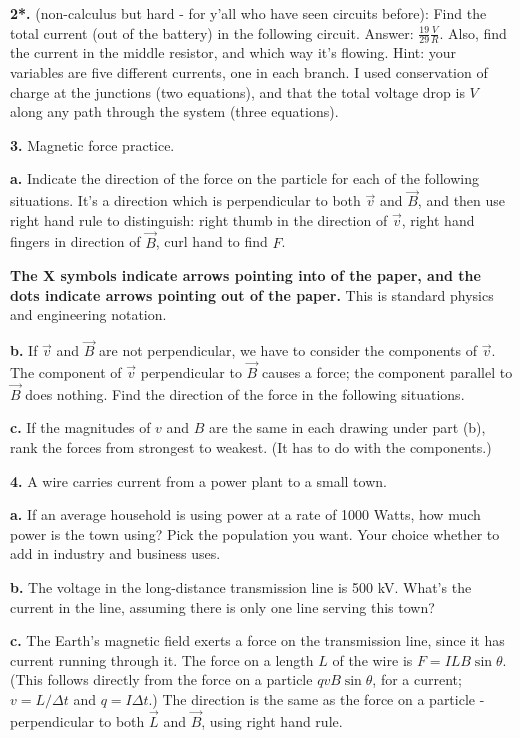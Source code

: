 \documentclass[12pt]{article}
\begin{document}
\textbf{2*.} (non-calculus but hard - for y'all who have seen circuits before): Find the total current (out of the battery) in the following circuit. Answer: $\frac{19}{29}\frac{V}{R}$. Also, find the current in the middle resistor, and which way it's flowing. Hint: your variables are five different currents, one in each branch. I used conservation of charge at the junctions (two equations), and that the total voltage drop is $V$ along any path through the system (three equations).

\newpage

\textbf{3.} Magnetic force practice. 

\textbf{a.} Indicate the direction of the force on the particle for each of the following situations. It's a direction which is perpendicular to both $\vec{v}$ and $\vec{B}$, and then use right hand rule to distinguish: right thumb in the direction of $\vec{v}$, right hand fingers in direction of $\vec{B}$, curl hand to find $F$.

\textbf{The X symbols indicate arrows pointing into of the paper, and the dots indicate arrows pointing out of the paper.} This is standard physics and engineering notation.

\vspace{3.25in}

\textbf{b.} If $\vec{v}$ and $\vec{B}$ are not perpendicular, we have to consider the components of $\vec{v}$. The component of $\vec{v}$ perpendicular to $\vec{B}$ causes a force; the component parallel to $\vec{B}$ does nothing. Find the direction of the force in the following situations. 

\vspace{2.75in}

\textbf{c.} If the magnitudes of $v$ and $B$ are the same in each drawing under part (b), rank the forces from strongest to weakest. (It has to do with the components.)

\newpage

\textbf{4.} A wire carries current from a power plant to a small town. 

\textbf{a.} If an average household is using power at a rate of 1000 Watts, how much power is the town using? Pick the population you want. Your choice whether to add in industry and business uses. 

\textbf{b.} The voltage in the long-distance transmission line is 500 kV. What's the current in the line, assuming there is only one line serving this town?

\textbf{c.} The Earth's magnetic field exerts a force on the transmission line, since it has current running through it. The force on a length $L$ of the wire is $F=ILB\sin \theta$. (This follows directly from the force on a particle $qvB\sin\theta$, for a current; $v=L/\Delta t$ and $q=I\Delta t$.) The direction is the same as the force on a particle - perpendicular to both $\vec{L}$ and $\vec{B}$, using right hand rule.
\end{document}
